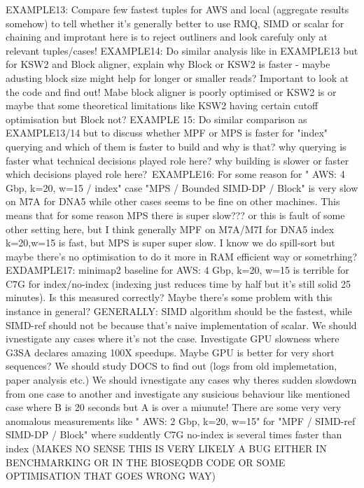 EXAMPLE13:
Compare few fastest tuples for AWS and local (aggregate results somehow) to tell whether it's generally better to use RMQ, SIMD or scalar for chaining and 
improtant here is to reject outliners and look carefuly only at relevant tuples/cases!
EXAMPLE14:
Do similar analysis like in EXAMPLE13 but for KSW2 and Block aligner, explain why Block or KSW2 is faster - maybe adusting block size might help for longer or smaller reads? Important to look at the code and find out! Mabe block aligner is poorly optimised or KSW2 is or maybe that some theoretical limitations like KSW2 having certain cutoff optimisation but Block not?
EXAMPLE 15:
Do similar comparison as EXAMPLE13/14 but to discuss whether MPF or MPS is faster for "index" querying and which of them is faster to build and why is that? why querying is faster what technical decisions played role here? why building is slower or faster which decisions played role here?\
EXAMPLE16:
For some reason for " AWS: 4 Gbp, k=20, w=15 / index" case "MPS / Bounded SIMD-DP / Block" is very slow on M7A for DNA5 while other cases seems to be fine on other machines.
This means that for some reason MPS there is super slow??? or this is fault of some other setting here, but I think generally MPF on M7A/M7I for DNA5 index k=20,w=15 is fast, but MPS is super super slow.
I know we do spill-sort but maybe there's no optimisation to do it more in RAM efficient way or sometrhing?
EXDAMPLE17:
minimap2 baseline for AWS: 4 Gbp, k=20, w=15 is terrible for C7G for index/no-index (indexing just reduces time by half but it's still solid 25 minutes).
Is this measured correctly? Maybe there's some problem with this instance in general?
GENERALLY:
SIMD algorithm should be the fastest, while SIMD-ref should not be because that's naive implementation of scalar. We should ivnestigate any cases where it's not the case.
Investigate  GPU slowness where G3SA declares amazing 100X speedups. Maybe GPU is better for very short sequences? We should study DOCS to find out (logs from old implemetation, paper analysis etc.)
We should ivnestigate any cases why theres sudden slowdown from one case to another and investigate any susicious behaviour like mentioned case where B is 20 seconds but A is over a miunute!
There are some very very anomalous measurements like " AWS: 2 Gbp, k=20, w=15" for "MPF / SIMD-ref SIMD-DP / Block" where suddently C7G no-index is several times faster than
index (MAKES NO SENSE THIS IS VERY LIKELY A BUG EITHER IN BENCHMARKING OR IN THE BIOSEQDB CODE OR SOME OPTIMISATION THAT GOES WRONG WAY)

